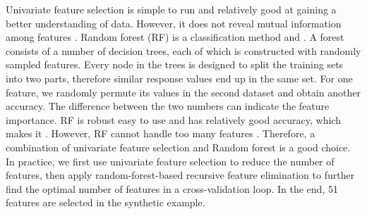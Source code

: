 Univariate feature selection is simple to run and relatively good at gaining a better understanding of data. However, it does not reveal mutual information among features \citep{chen2006combining}. Random forest (RF) is a classification method and  \citep{breiman2001random}. A forest consists of a number of decision trees, each of which is constructed with randomly sampled features. Every node in the trees is designed to split the training sets into two parts, therefore similar response values end up in the same set. For one feature, we randomly permute its values in the second dataset and obtain another accuracy. The difference between the two numbers can indicate the feature importance. RF is robust easy to use and has relatively good accuracy, which makes it . However, RF cannot handle too many features \citep{chen2006combining}. Therefore, a combination of univariate feature selection and Random forest is a good choice. In practice, we first use univariate feature selection to reduce the number of features, then apply random-forest-based recursive feature elimination to further find the optimal number of features in a cross-validation loop. In the end, 51 features are selected in the synthetic example.

